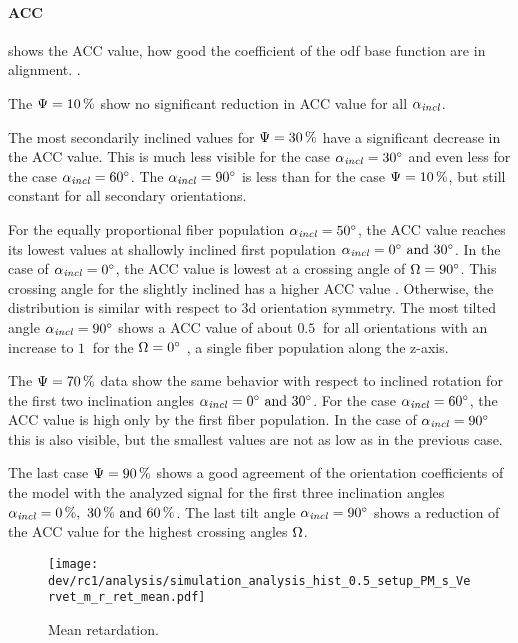 \paragraph{\acs{ACC}}
 shows the  \ac{ACC} value, \ie{} how good the coefficient of the odf base function are in alignment.
.
\par
%
The $\textnormal{$\Psi$}=\SI{10}{\percent}$ show no significant reduction in \ac{ACC} value for all $\textnormal{$\alpha_{\mathit{incl}}$}$.
\par
%
The most secondarily inclined values for $\textnormal{$\Psi$}=\SI{30}{\percent}$ have a significant decrease in the \ac{ACC} value.
This is much less visible for the case $\textnormal{$\alpha_{\mathit{incl}}$} = \SI{30}{\degree}$ and even less for the case $\textnormal{$\alpha_{\mathit{incl}}$} = \SI{60}{\degree}$.
The $\textnormal{$\alpha_{\mathit{incl}}$} = \SI{90}{\degree}$ is less than for the case $\textnormal{$\Psi$}=\SI{10}{\percent}$, but still constant for all secondary orientations.
\par
%
For the equally proportional fiber population $\textnormal{$\alpha_{\mathit{incl}}$} = \SI{50}{\degree}$, the \ac{ACC} value reaches its lowest values at shallowly inclined first population $\modelInc = \SIlist{0;30}{\degree}$.
In the case of $\textnormal{$\alpha_{\mathit{incl}}$} = \SI{0}{\degree}$, the \ac{ACC} value is lowest at a crossing angle of $\textnormal{$\Omega$} = \SI{90}{\degree}$.
This crossing angle for the slightly inclined has a higher \ac{ACC} value .
Otherwise, the distribution is similar with respect to 3d orientation symmetry.
The most tilted angle $\textnormal{$\alpha_{\mathit{incl}}$}=\SI{90}{\degree}$ shows a \ac{ACC} value of about $\SI{0.5}{}$ for all orientations with an increase to $\SI{1}{}$ for the $\textnormal{$\Omega$} = \SI{0}{\degree}$ ,\ie{} a single fiber population along the z-axis.
\par
%
The $\textnormal{$\Psi$}=\SI{70}{\percent}$ data show the same behavior with respect to inclined rotation for the first two inclination angles $\modelInc = \SIlist{0;30}{\degree}$.
For the case $\textnormal{$\alpha_{\mathit{incl}}$}=\SI{60}{\degree}$, the \ac{ACC} value is high only by the first fiber population.
In the case of $\textnormal{$\alpha_{\mathit{incl}}$}=\SI{90}{\degree}$ this is also visible, but the smallest values are not as low as in the previous case.
\par
%
The last case $\textnormal{$\Psi$}=\SI{90}{\percent}$ shows a good agreement of the orientation coefficients of the model with the analyzed signal for the first three inclination angles $\modelInc=\SIlist{0;30;60}{\percent}$.
The last tilt angle $\textnormal{$\alpha_{\mathit{incl}}$}=\SI{90}{\degree}$ shows a reduction of the \ac{ACC} value for the highest crossing angles $\textnormal{$\Omega$}$.
%
%
%
\begin{figure}[!p]
\centering
\texttt{[image: dev/rc1/analysis/simulation\_analysis\_hist\_0.5\_setup\_PM\_s\_Vervet\_m\_r\_ret\_mean.pdf]}
\caption{Mean retardation. }
\label{fig:sim_ana_ret}
\end{figure}
%
